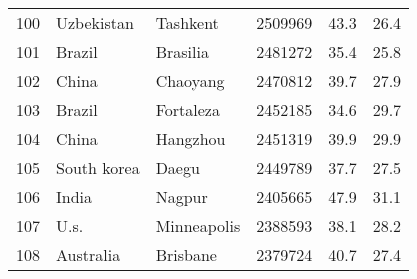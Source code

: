 \begin{center}
\begin{longtable}{clllcc}
        100                                      & Uzbekistan                           & Tashkent                          & 2509969                                 & 43.3                                  & 26.4                                  \\
        101                                      & Brazil                               & Brasilia                          & 2481272                                 & 35.4                                  & 25.8                                  \\
        102                                      & China                                & Chaoyang                          & 2470812                                 & 39.7                                  & 27.9                                  \\
        103                                      & Brazil                               & Fortaleza                         & 2452185                                 & 34.6                                  & 29.7                                  \\
        104                                      & China                                & Hangzhou                          & 2451319                                 & 39.9                                  & 29.9                                  \\
        105                                      & South korea                          & Daegu                             & 2449789                                 & 37.7                                  & 27.5                                  \\
        106                                      & India                                & Nagpur                            & 2405665                                 & 47.9                                  & 31.1                                  \\
        107                                      & U.s.                                 & Minneapolis                       & 2388593                                 & 38.1                                  & 28.2                                  \\
        108                                      & Australia                            & Brisbane                          & 2379724                                 & 40.7                                  & 27.4                                  \\

\end{longtable}
\end{center}
